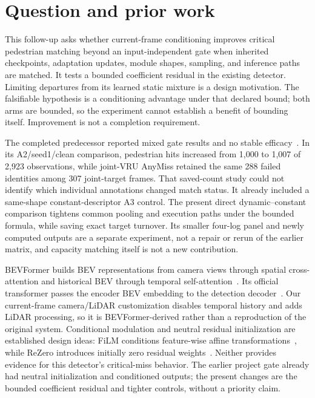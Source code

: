 \section{Question and prior work}
This follow-up asks whether current-frame conditioning improves critical pedestrian matching beyond an input-independent gate when inherited checkpoints, adaptation updates, module shapes, sampling, and inference paths are matched. It tests a bounded coefficient residual in the existing detector. Limiting departures from its learned static mixture is a design motivation. The falsifiable hypothesis is a conditioning advantage under that declared bound; both arms are bounded, so the experiment cannot establish a benefit of bounding itself. Improvement is not a completion requirement.

The completed predecessor reported mixed gate results and no stable efficacy~\cite{Wu2026CriticalMiss}. In its A2/seed1/clean comparison, pedestrian hits increased from 1,000 to 1,007 of 2,923 observations, while joint-VRU AnyMiss retained the same 288 failed identities among 307 joint-target frames. That saved-count study could not identify which individual annotations changed match status. It already included a same-shape constant-descriptor A3 control. The present direct dynamic--constant comparison tightens common pooling and execution paths under the bounded formula, while saving exact target turnover. Its smaller four-log panel and newly computed outputs are a separate experiment, not a repair or rerun of the earlier matrix, and capacity matching itself is not a new contribution.

BEVFormer builds BEV representations from camera views through spatial cross-attention and historical BEV through temporal self-attention~\cite{Li2022BEVFormer}. Its official transformer passes the encoder BEV embedding to the detection decoder~\cite{BEVFormerCode}. Our current-frame camera/LiDAR customization disables temporal history and adds LiDAR processing, so it is BEVFormer-derived rather than a reproduction of the original system. Conditional modulation and neutral residual initialization are established design ideas: FiLM conditions feature-wise affine transformations~\cite{Perez2018FiLM}, while ReZero introduces initially zero residual weights~\cite{Bachlechner2021ReZero}. Neither provides evidence for this detector's critical-miss behavior. The earlier project gate already had neutral initialization and conditioned outputs; the present changes are the bounded coefficient residual and tighter controls, without a priority claim.

